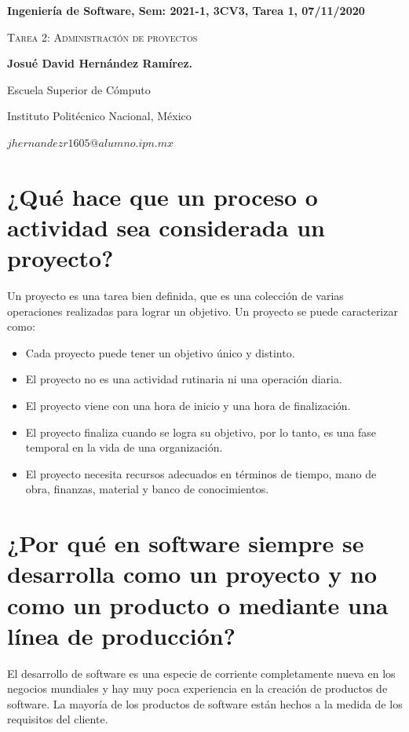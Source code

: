\documentclass[12pt,twoside]{article}
\date{}
\begin{document}
\centerline{\bf Ingeniería de Software, Sem: 2021-1, 3CV3, Tarea 1, 07/11/2020}
\centerline{}
\centerline{}
\begin{center}
\Large{\textsc{Tarea 2: Administración de proyectos}}
\end{center}
\centerline{}
\centerline{\bf {Josu\'e David Hern\'andez Ram\'irez.}}
\centerline{}
\centerline{Escuela Superior de C\'omputo}
\centerline{Instituto Polit\'ecnico Nacional, M\'exico}
\centerline{$jhernandezr1605@alumno.ipn.mx$}
\newtheorem{Theorem}{\quad Theorem}[section]
\newtheorem{Definition}[Theorem]{\quad Definition}
\newtheorem{Corollary}[Theorem]{\quad Corollary}
\newtheorem{Lemma}[Theorem]{\quad Lemma}
\newtheorem{Example}[Theorem]{\quad Example}
\bigskip
\section{¿Qué hace que un proceso o actividad sea considerada un proyecto?}
Un proyecto es una tarea bien definida, que es una colección de varias operaciones realizadas
para lograr un objetivo. Un proyecto se puede caracterizar como:
\begin{itemize}
    \item Cada proyecto puede tener un objetivo único y distinto.
    \item El proyecto no es una actividad rutinaria ni una operación diaria.
    \item El proyecto viene con una hora de inicio y una hora de finalización.
    \item El proyecto finaliza cuando se logra su objetivo, por lo tanto, es una 
    fase temporal en la vida de una organización.
    \item El proyecto necesita recursos adecuados en términos de tiempo, mano de 
    obra, finanzas, material y banco de conocimientos.
\end{itemize}


\section{¿Por qué en software siempre se desarrolla como un proyecto y no como un producto 
o mediante una línea de producción?}

El desarrollo de software es una especie de corriente completamente nueva en los 
negocios mundiales y hay muy poca experiencia en la creación de productos de 
software. La mayoría de los productos de software están hechos a la medida de 
los requisitos del cliente.\\
\end{document}
